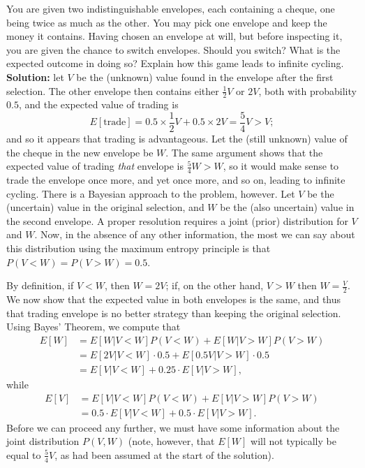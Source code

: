 \begin{Example}
You are given two indistinguishable envelopes, each containing a cheque, one being twice as much as the other. You may pick one envelope and keep the money it contains. Having chosen an envelope at will, but before inspecting it, you are given the chance to switch envelopes. Should you switch? What is the expected outcome in doing so? Explain how this game leads to infinite cycling. \newl \textbf{Solution:} let $V$ be the (unknown) value found in the envelope after the first selection. The other envelope then contains either $\frac{1}{2}V$ or $2V$, both with probability $0.5$, and the expected value of trading is $$E[\text{trade}]=0.5\times \frac{1}{2}V + 0.5 \times 2V = \frac{5}{4}V>V;$$ and so it appears that trading is advantageous. Let the (still unknown) value of the cheque in the new envelope be $W$. The same argument shows that the expected value of trading \textit{that} envelope is $\frac{5}{4}W>W$, so it would make sense to trade the envelope once more, and yet once more, and so on, leading to infinite cycling. \newl There is a Bayesian approach to the problem, however. Let $V$ be the (uncertain) value in the original selection, and $W$ be the (also uncertain) value in the second envelope. A proper resolution requires a joint (prior) distribution for $V$ and $W$. Now, in the absence of any other information, the most we can say about this distribution using the maximum entropy principle is that $P(V<W)=P(V>W)=0.5$. \par By definition, if $V<W$, then $W=2V$; if, on the other hand, $V>W$ then $W=\frac{V}{2}$. We now show that the expected value in both envelopes is the same, and thus that trading envelope is no better strategy than keeping the original selection. \newpage\noindent Using Bayes' Theorem, we compute that  
\begin{align*}E[W]&=E[W|V<W]P(V<W) + E[W|V>W]P(V>W) \\ &=E[2V|V<W]\cdot 0.5+E[0.5V|V>W]\cdot 0.5 \\ &= E[V|V<W]+0.25\cdot E[V|V>W],\end{align*} while \begin{align*}E[V]&=E[V|V<W]P(V<W) + E[V|V>W]P(V>W) \\ &=0.5\cdot E[V|V<W]+ 0.5\cdot E[V|V>W].\end{align*}
Before we can proceed any further, we must have some information about the joint distribution $P(V,W)$ (note, however, that $E[W]$ will not typically be equal to $\frac{5}{4}V$, as had been assumed at the start of the solution). \newl 

\end{Example}
